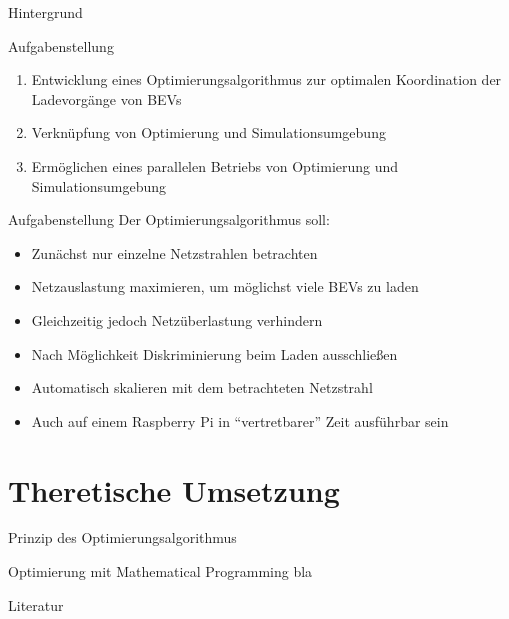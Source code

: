 \documentclass[aspectratio=169]{beamer}
\begin{document}
\begin{frame}{Hintergrund}
	\begin{figure}
		\centering
		
	\end{figure}
\end{frame}


\begin{frame}{Aufgabenstellung}
	\begin{enumerate}[<+->]
		\item Entwicklung eines Optimierungsalgorithmus zur optimalen 
		Koordination der Ladevorgänge von BEVs
		\item Verknüpfung von Optimierung und Simulationsumgebung
		\item Ermöglichen eines parallelen Betriebs von Optimierung und
		Simulationsumgebung
	\end{enumerate}
\end{frame}


\begin{frame}{Aufgabenstellung}
	Der Optimierungsalgorithmus soll:
	\begin{itemize}[<+(1)->]
		\item Zunächst nur einzelne Netzstrahlen betrachten
		\item Netzauslastung maximieren, um möglichst viele BEVs zu laden
		\item Gleichzeitig jedoch Netzüberlastung verhindern
		\item Nach Möglichkeit Diskriminierung beim Laden ausschließen
		\item Automatisch skalieren mit dem betrachteten Netzstrahl
		\item Auch auf einem Raspberry Pi in \enquote{vertretbarer} Zeit 
		ausführbar sein
	\end{itemize}
	
\end{frame}

\section{Theretische Umsetzung}

\begin{frame}{Prinzip des Optimierungsalgorithmus}
	\begin{figure}
		\centering
		
	\end{figure}
\end{frame}


\begin{frame}{Optimierung mit Mathematical Programming}
	bla
\end{frame}


\begin{frame}{Literatur}
	\printbibliography
\end{frame}
\end{document}
